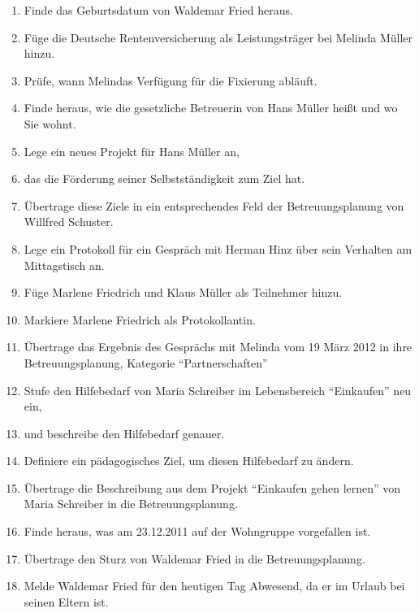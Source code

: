 \begin{description}
        \begin{enumerate}
		\item Finde das Geburtsdatum von Waldemar Fried heraus. 
		\item Füge die Deutsche Rentenversicherung als Leistungsträger bei Melinda Müller hinzu.
		\item Prüfe, wann Melindas Verfügung für die Fixierung abläuft.
		\item Finde heraus, wie die gesetzliche Betreuerin von Hans Müller heißt und wo Sie wohnt.
		\item Lege ein neues Projekt für Hans Müller an, 
		\item das die Förderung seiner Selbstständigkeit zum Ziel hat.
		\item Übertrage diese Ziele in ein entsprechendes Feld der Betreuungsplanung von Willfred Schuster.
		\item Lege ein Protokoll für ein Gespräch mit Herman Hinz über sein Verhalten am Mittagstisch an.
		\item Füge Marlene Friedrich und Klaus Müller als Teilnehmer hinzu.
		\item Markiere Marlene Friedrich als Protokollantin.
		\item Übertrage das Ergebnis des Gesprächs mit Melinda vom 19 März 2012 in ihre Betreuungsplanung, Kategorie ``Partnerschaften''
		\item Stufe den Hilfebedarf von Maria Schreiber im Lebensbereich ``Einkaufen'' neu ein,
		\item und beschreibe den Hilfebedarf genauer.
		\item Definiere ein pädagogisches Ziel, um diesen Hilfebedarf zu ändern.
		\item Übertrage die Beschreibung aus dem Projekt ``Einkaufen gehen lernen'' von Maria Schreiber in die Betreuungsplanung.
		\item Finde heraus, was am 23.12.2011 auf der Wohngruppe vorgefallen ist.
		\item Übertrage den Sturz von Waldemar Fried in die Betreuungsplanung.
		\item Melde Waldemar Fried für den heutigen Tag Abwesend, da er im Urlaub bei seinen Eltern ist.
        \end{enumerate}

\end{description}


